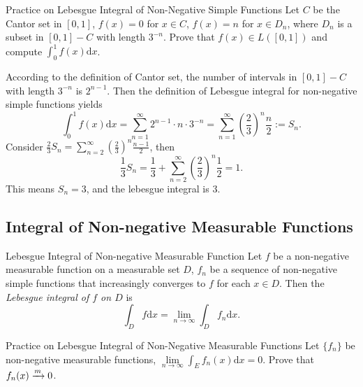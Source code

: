 \begin{example}{Practice on Lebesgue Integral of Non-Negative Simple Functions}{}
  Let $C$ be the Cantor set in $[0, 1]$,
  $f(x) = 0$ for $x \in C$, $f(x) = n$ for $x \in D_n$,
  where $D_n$ is a subset in $[0, 1] - C$ with length $3^{-n}$.
  Prove that $f(x) \in L([0, 1])$ and compute $\int_0^1 f(x)\mathrm{d} x$.
\end{example}

\begin{solution}
  According to the definition of Cantor set,
  the number of intervals in $[0, 1] - C$ with length $3^{-n}$ is $2^{n-1}$.
  Then the definition of Lebesgue integral for non-negative simple functions yields
  \begin{equation}
    \int_0^1 f(x)\mathrm{d} x
    = \sum\limits_{n = 1}^{\infty} 2^{n-1} \cdot n \cdot 3^{-n}
    = \sum\limits_{n = 1}^{\infty} \left( \frac{2}{3} \right)^n \frac{n}{2}
    := S_n.
  \end{equation}
  Consider $\frac{2}{3}S_n = \sum\limits_{n = 2}^{\infty} (\frac{2}{3})^n
  \frac{n-1}{2}$, then
  \begin{equation}
    \frac{1}{3}S_n = \frac{1}{3} + \sum\limits_{n = 2}^{\infty} \left( \frac{2}{3} \right)^n \frac{1}{2}
    = 1.
  \end{equation}
  This means $S_n = 3$, and the lebesgue integral is $3$.
\end{solution}

\subsection{Integral of Non-negative Measurable Functions}

\begin{definition}{Lebesgue Integral of Non-negative Measurable Function}{}
  Let $f$ be a non-negative measurable function on a measurable set $D$,
  $f_n$ be a sequence of non-negative simple functions that increasingly
  converges to $f$ for each $x \in D$.
  Then the \emph{Lebesgue integral of $f$ on $D$} is
  \begin{equation}
    \int_D f \mathrm{d} x= \lim \limits _{n \rightarrow \infty} \int_D f_n \mathrm{d} x.
  \end{equation}
\end{definition}

\begin{example}{Practice on Lebesgue Integral of Non-Negative Measurable Functions}{}
  Let $\{f_n\}$ be non-negative measurable functions,
  $\lim \limits _{n \rightarrow \infty} \int_E f_n(x)\mathrm{d} x = 0$.
  Prove that $f_n(x) \xrightarrow{m} 0$.
\end{example}

